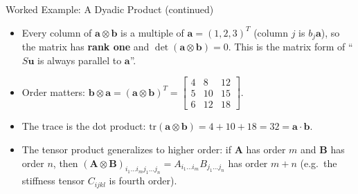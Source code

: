 \documentclass[aspectratio=169,11pt]{beamer}
\begin{document}
\begin{frame}{Worked Example: A Dyadic Product (continued)}
\begin{itemize}
\item Every column of $\mathbf{a}\otimes\mathbf{b}$ is a multiple of $\mathbf{a}=(1,2,3)^T$ (column $j$ is $b_j\mathbf{a}$), so the matrix has \textbf{rank one} and $\det(\mathbf{a}\otimes\mathbf{b})=0$. This is the matrix form of ``$S\mathbf{u}$ is always parallel to $\mathbf{a}$''.
\item Order matters: $\mathbf{b}\otimes\mathbf{a} = (\mathbf{a}\otimes\mathbf{b})^T = \begin{bmatrix} 4 & 8 & 12 \\ 5 & 10 & 15 \\ 6 & 12 & 18 \end{bmatrix}$.
\item The trace is the dot product: $\mathrm{tr}(\mathbf{a}\otimes\mathbf{b}) = 4+10+18 = 32 = \mathbf{a}\cdot\mathbf{b}$.
\item The tensor product generalizes to higher order: if $\mathbf{A}$ has order $m$ and $\mathbf{B}$ has order $n$, then $(\mathbf{A}\otimes\mathbf{B})_{i_1\dots i_m j_1\dots j_n} = A_{i_1\dots i_m}B_{j_1\dots j_n}$ has order $m+n$ (e.g.\ the stiffness tensor $C_{ijkl}$ is fourth order).
\end{itemize}
\end{frame}
\end{document}
